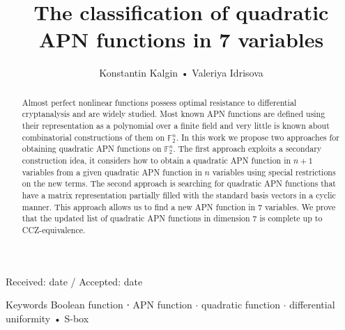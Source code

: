 \documentclass[10pt]{article}
\title{The classification of quadratic APN functions in 7 variables }
\author{Konstantin Kalgin • Valeriya Idrisova}
\date{}
\begin{document}
\maketitle
\captionsetup{singlelinecheck=false}
Received: date / Accepted: date

\begin{abstract}
Almost perfect nonlinear functions possess optimal resistance to differential cryptanalysis and are widely studied. Most known APN functions are defined using their representation as a polynomial over a finite field and very little is known about combinatorial constructions of them on $\mathbb{F}_{2}^{n}$. In this work we propose two approaches for obtaining quadratic APN functions on $\mathbb{F}_{2}^{n}$. The first approach exploits a secondary construction idea, it considers how to obtain a quadratic APN function in $n+1$ variables from a given quadratic APN function in $n$ variables using special restrictions on the new terms. The second approach is searching for quadratic APN functions that have a matrix representation partially filled with the standard basis vectors in a cyclic manner. This approach allows us to find a new APN function in 7 variables. We prove that the updated list of quadratic APN functions in dimension 7 is complete up to CCZ-equivalence.
\end{abstract}

Keywords Boolean function ⋅ APN function $\cdot$ quadratic function $\cdot$ differential uniformity • S-box
\end{document}
